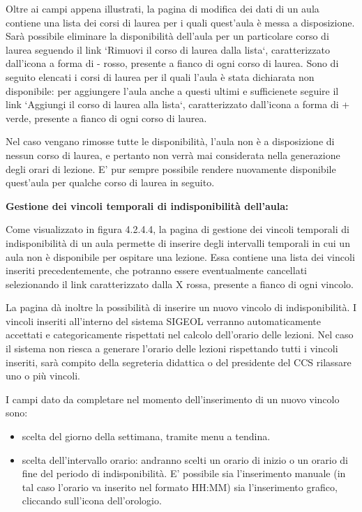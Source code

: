 \documentclass[11pt,a4paper]{article}
\begin{document}
Oltre ai campi appena illustrati, la pagina di modifica dei dati di un aula contiene una lista dei corsi di laurea per i quali quest'aula è messa a disposizione.
Sarà possibile eliminare la disponibilità dell'aula per un particolare corso di laurea seguendo il link `Rimuovi il corso di laurea dalla lista`, caratterizzato dall'icona a forma di - rosso, presente a fianco di ogni corso di laurea.
Sono di seguito elencati i corsi di laurea per il quali l'aula è stata dichiarata non disponibile: per aggiungere l'aula anche a questi ultimi e sufficienete seguire il link `Aggiungi il corso di laurea alla lista`, caratterizzato dall'icona a forma di + verde, presente a fianco di ogni corso di laurea.

Nel caso vengano rimosse tutte le disponibilità, l'aula non è a disposizione di nessun corso di laurea, e pertanto non verrà mai considerata nella generazione degli orari di lezione.
E' pur sempre possibile rendere nuovamente disponibile quest'aula per qualche corso di laurea in seguito.
\newline \newline
\begin{large}\textbf{Gestione dei vincoli temporali di indisponibilità dell'aula:}\end{large}
\newline \newline
Come visualizzato in figura 4.2.4.4, la pagina di gestione dei vincoli temporali di indisponibilità di un aula permette di inserire degli intervalli temporali in cui un aula non è disponibile per ospitare una lezione.
Essa contiene una lista dei vincoli inseriti precedentemente, che potranno essere eventualmente cancellati selezionando il link caratterizzato dalla X rossa, presente a fianco di ogni vincolo.

La pagina dà inoltre la possibilità di inserire un nuovo vincolo di indisponibilità.
I vincoli inseriti all'interno del sistema SIGEOL verranno automaticamente accettati e categoricamente rispettati nel calcolo dell'orario delle lezioni.
Nel caso il sistema non riesca a generare l'orario delle lezioni rispettando tutti i vincoli inseriti, sarà compito della segreteria didattica o del presidente del CCS rilassare uno o più vincoli.

I campi dato da completare nel momento dell'inserimento di un nuovo vincolo sono:
\begin{itemize}
 \item scelta del giorno della settimana, tramite menu a tendina.
 \item scelta dell'intervallo orario: andranno scelti un orario di inizio o un orario di fine del periodo di indisponibilità. E' possibile sia l'inserimento manuale (in tal caso l'orario va inserito nel formato HH:MM) sia l'inserimento grafico, cliccando sull'icona dell'orologio.
\end{itemize}
\end{document}
